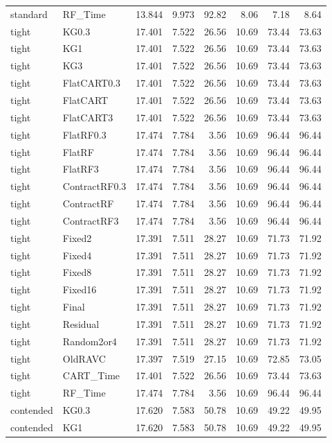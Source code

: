 \begin{longtable}{@{}llrrrrrr@{}}
standard & RF\_Time & 13.844 & 9.973 & 92.82 & 8.06 & 7.18 & 8.64\\
tight & KG0.3 & 17.401 & 7.522 & 26.56 & 10.69 & 73.44 & 73.63\\
tight & KG1 & 17.401 & 7.522 & 26.56 & 10.69 & 73.44 & 73.63\\
tight & KG3 & 17.401 & 7.522 & 26.56 & 10.69 & 73.44 & 73.63\\
tight & FlatCART0.3 & 17.401 & 7.522 & 26.56 & 10.69 & 73.44 & 73.63\\
tight & FlatCART & 17.401 & 7.522 & 26.56 & 10.69 & 73.44 & 73.63\\
tight & FlatCART3 & 17.401 & 7.522 & 26.56 & 10.69 & 73.44 & 73.63\\
tight & FlatRF0.3 & 17.474 & 7.784 & 3.56 & 10.69 & 96.44 & 96.44\\
tight & FlatRF & 17.474 & 7.784 & 3.56 & 10.69 & 96.44 & 96.44\\
tight & FlatRF3 & 17.474 & 7.784 & 3.56 & 10.69 & 96.44 & 96.44\\
tight & ContractRF0.3 & 17.474 & 7.784 & 3.56 & 10.69 & 96.44 & 96.44\\
tight & ContractRF & 17.474 & 7.784 & 3.56 & 10.69 & 96.44 & 96.44\\
tight & ContractRF3 & 17.474 & 7.784 & 3.56 & 10.69 & 96.44 & 96.44\\
tight & Fixed2 & 17.391 & 7.511 & 28.27 & 10.69 & 71.73 & 71.92\\
tight & Fixed4 & 17.391 & 7.511 & 28.27 & 10.69 & 71.73 & 71.92\\
tight & Fixed8 & 17.391 & 7.511 & 28.27 & 10.69 & 71.73 & 71.92\\
tight & Fixed16 & 17.391 & 7.511 & 28.27 & 10.69 & 71.73 & 71.92\\
tight & Final & 17.391 & 7.511 & 28.27 & 10.69 & 71.73 & 71.92\\
tight & Residual & 17.391 & 7.511 & 28.27 & 10.69 & 71.73 & 71.92\\
tight & Random2or4 & 17.391 & 7.511 & 28.27 & 10.69 & 71.73 & 71.92\\
tight & OldRAVC & 17.397 & 7.519 & 27.15 & 10.69 & 72.85 & 73.05\\
tight & CART\_Time & 17.401 & 7.522 & 26.56 & 10.69 & 73.44 & 73.63\\
tight & RF\_Time & 17.474 & 7.784 & 3.56 & 10.69 & 96.44 & 96.44\\
contended & KG0.3 & 17.620 & 7.583 & 50.78 & 10.69 & 49.22 & 49.95\\
contended & KG1 & 17.620 & 7.583 & 50.78 & 10.69 & 49.22 & 49.95\\

\end{longtable}
